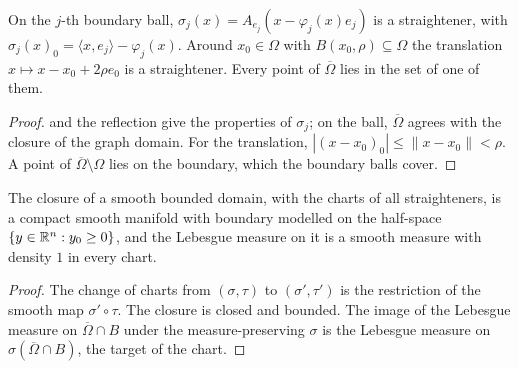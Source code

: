 \begin{lemma}
\label{lem:straighteners}
\leanok
{}
On the $j$-th boundary ball, $\sigma_j(x) = A_{e_j}(x - \varphi_j(x) e_j)$ is a straightener, with
$\sigma_j(x)_0 = \langle x, e_j \rangle - \varphi_j(x)$. Around $x_0 \in \Omega$ with
$B(x_0, \rho) \subseteq \Omega$ the translation $x \mapsto x - x_0 + 2\rho e_0$ is a straightener.
Every point of $\overline{\Omega}$ lies in the set of one of them.
\end{lemma}

\begin{proof}
\leanok
{} and the reflection give the properties of $\sigma_j$; on the ball,
$\overline{\Omega}$ agrees with the closure of the graph domain. For the translation,
$|(x - x_0)_0| \leq \|x - x_0\| < \rho$. A point of $\overline{\Omega} \setminus \Omega$ lies on the
boundary, which the boundary balls cover.
\end{proof}

\begin{theorem}
\label{thm:smooth-domain-manifold}
\leanok
{}
The closure of a smooth bounded domain, with the charts of all straighteners, is a compact smooth
manifold with boundary modelled on the half-space $\{y \in \mathbb{R}^n : y_0 \geq 0\}$, and the Lebesgue
measure on it is a smooth measure with density $1$ in every chart.
\end{theorem}

\begin{proof}
\leanok
The change of charts from $(\sigma, \tau)$ to $(\sigma', \tau')$ is the restriction of the smooth
map $\sigma' \circ \tau$. The closure is closed and bounded. The image of the Lebesgue measure on
$\overline{\Omega} \cap B$ under the measure-preserving $\sigma$ is the Lebesgue measure on
$\sigma(\overline{\Omega} \cap B)$, the target of the chart.
\end{proof}

